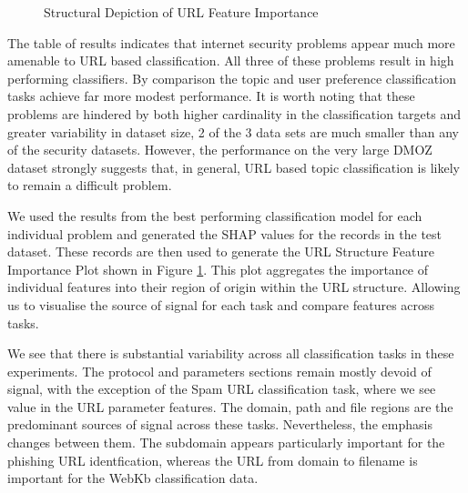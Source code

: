 \documentclass{aircc}
\begin{document}
\begin{figure}
\centering
{}
\caption{Structural Depiction of URL Feature Importance}
\label{fig:importance}
\end{figure}

The table of results indicates that internet security problems appear much more 
amenable to URL based classification. All three of these problems result in high 
performing classifiers. By comparison the topic and user preference classification
tasks achieve far more modest performance. It is worth noting that these problems 
are hindered by both higher cardinality in the classification targets and greater 
variability in dataset size, 2 of the 3 data sets are much smaller than any of the 
security datasets. However, the performance on the very large DMOZ
dataset strongly suggests that, in general, URL based topic classification is 
likely to remain a difficult problem. 

We used the results from the best performing classification model for each 
individual problem and generated the SHAP values for the records in the test dataset. 
These records are then used to generate the URL Structure Feature Importance Plot 
shown in Figure \ref{fig:importance}. This plot aggregates the importance of individual
features into their region of origin within the URL structure. 
Allowing us to visualise the source of signal for
each task and compare features across tasks.

We see that there is substantial variability across all classification tasks in 
these experiments.
The protocol and parameters sections remain mostly devoid of signal, with the 
exception of the Spam URL classification task, where we see value in the URL 
parameter features. The domain, path and file regions are the predominant sources
of signal across these tasks. Nevertheless, the emphasis changes between them. 
The subdomain appears particularly
important for the phishing URL identfication, whereas the URL from domain to filename 
is important for the WebKb classification data.
\end{document}
